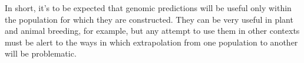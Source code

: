 In short, it's to be expected that genomic predictions will be useful
only within the population for which they are constructed. They can be
very useful in plant and animal breeding, for example, but any attempt
to use them in other contexts must be alert to the ways in which
extrapolation from one population to another will be problematic.

